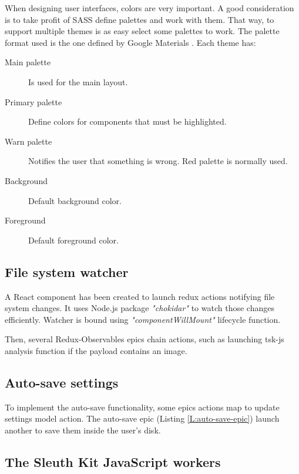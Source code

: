 When designing user interfaces, colors are very important. A good consideration
is to take profit of SASS define palettes and work with them. That way, to
support multiple themes is as easy select some palettes to work. The palette
format used is the one defined by Google Materials \cite{google-materials-web}.
Each theme has:

\begin{description}
	\item[Main palette] Is used for the main layout.
	\item[Primary palette] Define colors for components that must be
	highlighted.
	\item[Warn palette] Notifies the user that something is wrong. Red palette
	is normally used.
	\item[Background] Default background color.
	\item[Foreground] Default foreground color.
\end{description}


\subsection{File system watcher}

A React component has been created to launch redux actions notifying file
system changes. It uses Node.js package \textit{"chokidar"} to watch those
changes efficiently. Watcher is bound using \textit{"componentWillMount"}
lifecycle function.

Then, several Redux-Observables epics chain actions, such as launching tsk-js
analysis function if the payload contains an image.

\subsection{Auto-save settings}

To implement the auto-save functionality, some epics actions map to update
settings model action. The auto-save epic (Listing \ref{L:auto-save-epic})
launch another to save them inside the user's disk.

\begin{codefigure}
\end{codefigure}

\subsection{The Sleuth Kit JavaScript workers}

